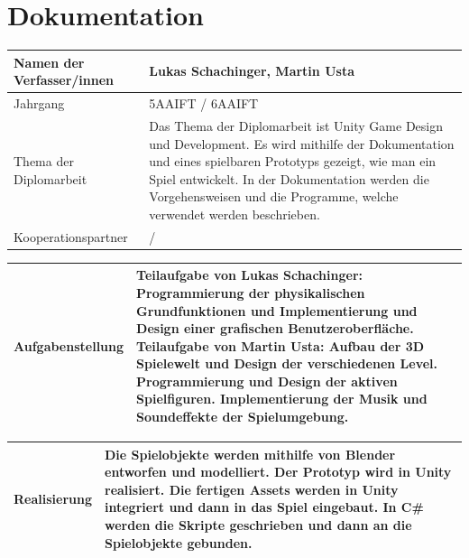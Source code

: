 \chapter{Dokumentation}

\renewcommand{\arraystretch}{2} %

\begin{tabular}{|m{}|m{}|}
\hline
Namen der Verfasser/innen & Lukas Schachinger, Martin Usta \\
\hline
Jahrgang & 5AAIFT / 6AAIFT \\
\hline
Thema der Diplomarbeit & Das Thema der Diplomarbeit ist Unity Game Design und Development. Es wird mithilfe der Dokumentation und eines spielbaren Prototyps gezeigt, wie man ein Spiel entwickelt. 
In der Dokumentation werden die Vorgehensweisen und die Programme, welche verwendet werden beschrieben. \\
\hline
Kooperationspartner & / \\
\hline
\end{tabular}

\vspace{10pt}

\noindent
\begin{tabular}{|m{}|m{}|}
\hline
Aufgabenstellung & Teilaufgabe von Lukas Schachinger: \newline \newline Programmierung der physikalischen Grundfunktionen und Implementierung und Design einer grafischen Benutzeroberfläche. \newline \newline Teilaufgabe von Martin Usta: \newline \newline Aufbau der 3D Spielewelt und Design der verschiedenen Level. Programmierung und Design der aktiven Spielfiguren. Implementierung der Musik und Soundeffekte der Spielumgebung.\\
\hline
\end{tabular}

\pagebreak

\noindent
\begin{tabular}{|m{}|m{}|}
\hline
Realisierung & Die Spielobjekte werden mithilfe von Blender entworfen und modelliert. \newline \newline Der Prototyp wird in Unity realisiert. Die fertigen Assets werden in Unity integriert und dann in das Spiel eingebaut. \newline \newline In C\# werden die Skripte geschrieben und dann an die Spielobjekte gebunden. \\
\hline
\end{tabular}

